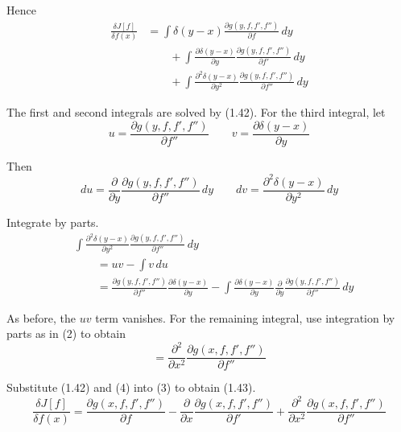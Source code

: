 Hence
\begin{equation*}
\begin{aligned}
\frac{\delta J[f]}{\delta f(x)}
&=\int\delta(y-x)\frac{\partial g(y,f,f',f'')}{\partial f}\,dy
\\
&\qquad{}+\int\frac{\partial\delta(y-x)}{\partial y}\frac{\partial g(y,f,f',f'')}{\partial f'}\,dy
\\
&\qquad{}+\int\frac{\partial^2\delta(y-x)}{\partial y^2}\frac{\partial g(y,f,f',f'')}{\partial f''}\,dy
\end{aligned}
\tag{3}
\end{equation*}

The first and second integrals are solved by (1.42).
For the third integral, let
\begin{equation*}
u=\frac{\partial g(y,f,f',f'')}{\partial f''}
\qquad
v=\frac{\partial\delta(y-x)}{\partial y}
\end{equation*}

Then
\begin{equation*}
du=\frac{\partial}{\partial y}\frac{\partial g(y,f,f',f'')}{\partial f''}\,dy
\qquad
dv=\frac{\partial^2\delta(y-x)}{\partial y^2}\,dy
\end{equation*}

Integrate by parts.
\begin{align*}
&\int\frac{\partial^2\delta(y-x)}{\partial y^2}\frac{\partial g(y,f,f',f'')}{\partial f''}\,dy
\\
&\qquad{}=uv-\int v\,du
\\
&\qquad{}=\frac{\partial g(y,f,f',f'')}{\partial f''}\frac{\partial\delta(y-x)}{\partial y}
-\int\frac{\partial\delta(y-x)}{\partial y}
\frac{\partial}{\partial y}\frac{\partial g(y,f,f',f'')}{\partial f''}\,dy
\end{align*}

As before, the $uv$ term vanishes.
For the remaining integral, use integration by parts as in (2) to obtain
\begin{equation*}
{}=\frac{\partial^2}{\partial x^2}\frac{\partial g(x,f,f',f'')}{\partial f''}
\tag{4}
\end{equation*}

Substitute (1.42) and (4) into (3) to obtain (1.43).
\begin{equation*}
\frac{\delta J[f]}{\delta f(x)}
=\frac{\partial g(x,f,f',f'')}{\partial f}
-\frac{\partial}{\partial x}\frac{\partial g(x,f,f',f'')}{\partial f'}
+\frac{\partial^2}{\partial x^2}\frac{\partial g(x,f,f',f'')}{\partial f''}
\end{equation*}


